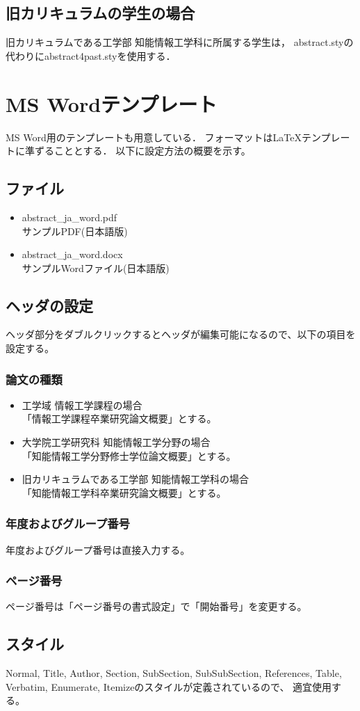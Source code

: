 \documentclass[a4paper,twoside,twocolumn,10pt]{article}
\begin{document}
\subsection{旧カリキュラムの学生の場合}
旧カリキュラムである工学部 知能情報工学科に所属する学生は，
abstract.styの代わりにabstract4past.styを使用する．

\section{MS Wordテンプレート}
MS Word用のテンプレートも用意している．
フォーマットはLaTeXテンプレートに準ずることとする．
以下に設定方法の概要を示す。

\subsection{ファイル}
\begin{itemize}
\item abstract\_ja\_word.pdf\\
  サンプルPDF(日本語版)
\item abstract\_ja\_word.docx\\
  サンプルWordファイル(日本語版)
\end{itemize}

\subsection{ヘッダの設定}
ヘッダ部分をダブルクリックするとヘッダが編集可能になるので、以下の項目を設定する。

\subsubsection{論文の種類}
\begin{itemize}
\item 工学域 情報工学課程の場合\\
  「情報工学課程卒業研究論文概要」とする。
\item 大学院工学研究科 知能情報工学分野の場合\\
  「知能情報工学分野修士学位論文概要」とする。
\item 旧カリキュラムである工学部 知能情報工学科の場合\\
  「知能情報工学科卒業研究論文概要」とする。
\end{itemize}
\subsubsection{年度およびグループ番号}
年度およびグループ番号は直接入力する。
\subsubsection{ページ番号}
ページ番号は「ページ番号の書式設定」で「開始番号」を変更する。

\subsection{スタイル}
Normal, Title, Author, Section, SubSection, SubSubSection, References,
Table, Verbatim, Enumerate, Itemizeのスタイルが定義されているので、
適宜使用する。





\end{document}
